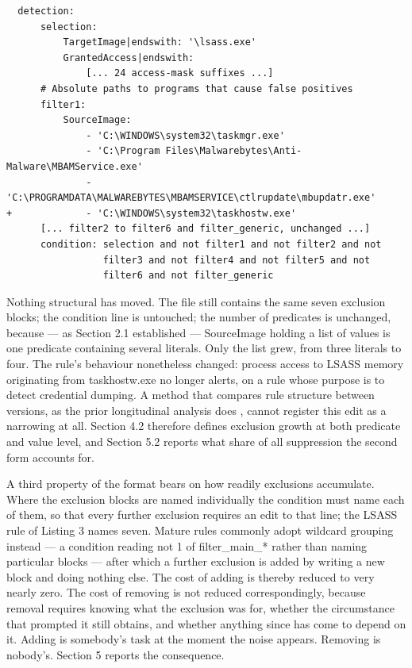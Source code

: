 \begin{listing}[htbp]
\caption{A value-level exclusion --- the complete file diff. Rule win\_susp\_proc\_access\_lsass.yml (UUID a18dd26b-6450-46de-8c91-9659150cf088) at commit 8f22165f, 28 November 2021, committed by Florian Roth with the message ``fix: FPs noticed with Aurora''. One line was added and nothing else in the file changed --- not even the modified date. Unmarked lines are unchanged context, reproduced from the same revision; elisions are marked.}
\label{listing:3}
\begin{lstlisting}
  detection:
      selection:
          TargetImage|endswith: '\lsass.exe'
          GrantedAccess|endswith:
              [... 24 access-mask suffixes ...]
      # Absolute paths to programs that cause false positives
      filter1:
          SourceImage:
              - 'C:\WINDOWS\system32\taskmgr.exe'
              - 'C:\Program Files\Malwarebytes\Anti-Malware\MBAMService.exe'
              - 'C:\PROGRAMDATA\MALWAREBYTES\MBAMSERVICE\ctlrupdate\mbupdatr.exe'
+             - 'C:\WINDOWS\system32\taskhostw.exe'
      [... filter2 to filter6 and filter_generic, unchanged ...]
      condition: selection and not filter1 and not filter2 and not
                 filter3 and not filter4 and not filter5 and not
                 filter6 and not filter_generic
\end{lstlisting}
\end{listing}

Nothing structural has moved. The file still contains the same seven exclusion blocks; the condition line is untouched; the number of predicates is unchanged, because --- as Section 2.1 established --- SourceImage holding a list of values is one predicate containing several literals. Only the list grew, from three literals to four. The rule's behaviour nonetheless changed: process access to LSASS memory originating from taskhostw.exe no longer alerts, on a rule whose purpose is to detect credential dumping. A method that compares rule structure between versions, as the prior longitudinal analysis does \citep{long2026}, cannot register this edit as a narrowing at all. Section 4.2 therefore defines exclusion growth at both predicate and value level, and Section 5.2 reports what share of all suppression the second form accounts for.

A third property of the format bears on how readily exclusions accumulate. Where the exclusion blocks are named individually the condition must name each of them, so that every further exclusion requires an edit to that line; the LSASS rule of Listing 3 names seven. Mature rules commonly adopt wildcard grouping instead --- a condition reading not 1 of filter\_main\_* rather than naming particular blocks --- after which a further exclusion is added by writing a new block and doing nothing else. The cost of adding is thereby reduced to very nearly zero. The cost of removing is not reduced correspondingly, because removal requires knowing what the exclusion was for, whether the circumstance that prompted it still obtains, and whether anything since has come to depend on it. Adding is somebody's task at the moment the noise appears. Removing is nobody's. Section 5 reports the consequence.

